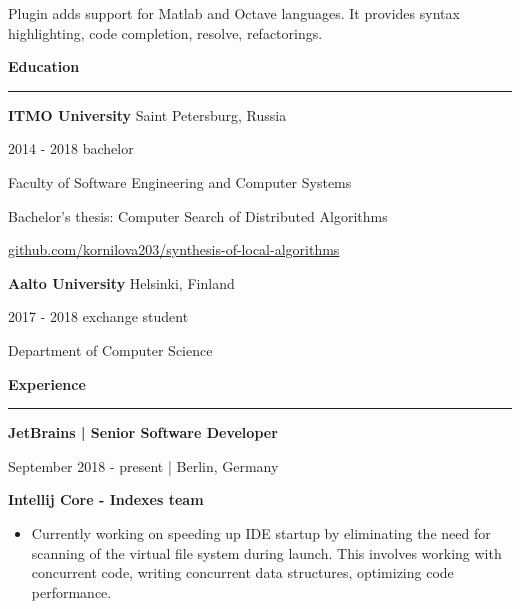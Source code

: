\documentclass[9pt]{article}
\begin{document}
\begin{multicols}{2}
\vspace{0.3em}

Plugin adds support for Matlab and Octave languages. It provides syntax highlighting, code completion, resolve, refactorings.

\vspace{2em}
{\textbf{Education}}
\vspace{0.5em}
\hrule
\vspace{1em}

{\textbf{ITMO University}} \color{gray} Saint Petersburg, Russia \color{black}

\color{gray} 2014 - 2018 bachelor \color{black}
\vspace{0.3em}

Faculty of Software Engineering and Computer Systems

Bachelor’s thesis: Computer Search of Distributed Algorithms

\href{https://github.com/kornilova203/synthesis-of-local-algorithms}{github.com/kornilova203/synthesis-of-local-algorithms}


\vspace{2em}

{\textbf{Aalto University}} \color{gray} Helsinki, Finland \color{black}

\color{gray} 2017 - 2018 exchange student \color{black}
\vspace{0.3em}

Department of Computer Science


\columnbreak

\vspace{0.5em}

{\textbf{Experience}}

\vspace{0.5em}

\hrule

\vspace{1em}

{\textbf{JetBrains | Senior Software Developer}}

\color{gray} September 2018 - present | Berlin, Germany \color{black}

\vspace{1.3em}
\hspace{2.2em} {\textbf{Intellij Core - Indexes team}}
\begin{itemize}
    \item Currently working on speeding up IDE startup by eliminating the need for scanning of the virtual file system during launch. This involves working with concurrent code, writing concurrent data structures, optimizing code performance.
\end{itemize}


\end{multicols}
\end{document}
